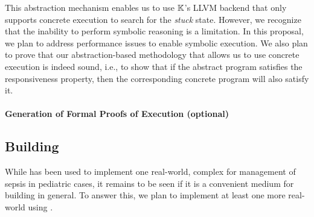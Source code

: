 This abstraction mechanism enables us to use $\mathbb{K}$'s LLVM backend
that only supports concrete execution to search for the \emph{stuck}
state. However, we recognize that the inability to perform symbolic
reasoning is a limitation. In this proposal, we plan to
address performance issues to enable symbolic execution.
We also plan to prove that our abstraction-based methodology
that allows us to use concrete execution is indeed sound, i.e.,
to show that if the abstract program satisfies the responsiveness
property, then the corresponding concrete program will also satisfy it.

\paragraph{Generation of Formal Proofs of Execution (optional)}

\subsection{Building \CDSSs{}}

While \MediK{} has been used to implement one real-world, complex
\CDSSs{} for management of sepsis in pediatric cases, it remains
to be seen if it is a convenient medium for building \CDSSs{} in general.
To answer this, we plan to implement at least one more real-world \CDSS{}
using \MediK{}.



